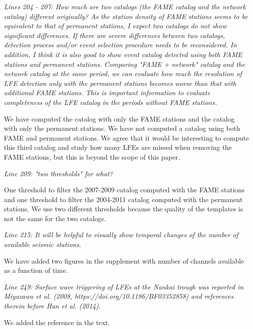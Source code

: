 \documentclass[letterpaper, 12pt]{article}
\begin{document}
\textit{Lines 204 - 207: How much are two catalogs (the FAME catalog and the network catalog) different originally? As the station density of FAME stations seems to be equivalent to that of permanent stations, I expect two catalogs do not show significant differences. If there are severe differences between two catalogs, detection process and/or event selection procedure needs to be reconsidered. In addition, I think it is also good to show event catalog detected using both FAME stations and permanent stations. Comparing "FAME + network" catalog and the network catalog at the same period, we can evaluate how much the resolution of LFE detection only with the permanent stations becomes worse than that with additional FAME stations. This is important information to evaluate completeness of the LFE catalog in the periods without FAME stations.}

\bigskip

We have computed the catalog with only the FAME stations and the catalog with only the permanent stations. We have not computed a catalog using both FAME and permanent stations. We agree that it would be interesting to compute this third catalog and study how many LFEs are missed when removing the FAME stations, but this is beyond the scope of this paper.

\bigskip

\textit{Line 209: "two thresholds" for what?}

\bigskip

One threshold to filter the 2007-2009 catalog computed with the FAME stations and one threshold to filter the 2004-2011 catalog computed with the permanent stations. We use two different thresholds because the quality of the templates is not the same for the two catalogs.

\bigskip

\textit{Line 215: It will be helpful to visually show temporal changes of the number of available seismic stations.}

\bigskip

We have added two figures in the supplement with number of channels available as a function of time.

\bigskip

\textit{Line 249: Surface wave triggering of LFEs at the Nankai trough was reported in Miyazawa et al. (2008, https://doi.org/10.1186/BF03352858) and references therein before Han et al. (2014).}

\bigskip

We added the reference in the text.
\end{document}
